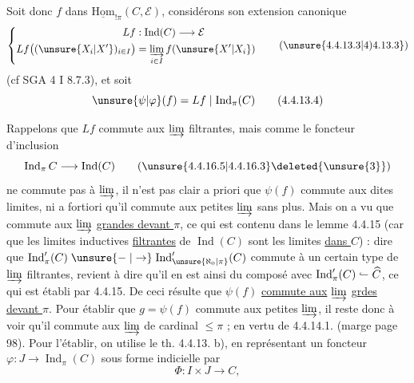 Soit donc $f$ dans $\underline{\mathrm{Hom}}_{!\pi}(C,\mathcal E)$, considérons son extension canonique
\[
\left\{\begin{aligned}
 Lf &: \operatorname{Ind}(C)\longrightarrow\mathcal E\\
 Lf\big((\unsure{X_i|X'})_{i\in I}\big)&=\varinjlim_{i\in I} f(\unsure{X'|X_i})
\end{aligned}\right.\tag*{(\unsure{4.4.13.3|4)4.13.3})}
\]
(cf SGA 4 I 8.7.3), et soit
\[
\unsure{\psi|\varphi}(f)=Lf\mid\operatorname{Ind}_\pi(C)\tag*{(4.4.13.4)}
\]

Rappelons que $Lf$ commute aux  $\varinjlim$ filtrantes, mais comme le foncteur d'inclusion
\[
\operatorname{Ind}_\pi C\longrightarrow\operatorname{Ind}(C)\tag*{(\unsure{4.4.16.5|4.4.16.3}\text{\deleted{\unsure{3}}})}
\]
ne commute pas à  $\varinjlim$,  il n'est pas clair a priori que $\psi(f)$ commute aux dites limites, ni a fortiori qu'il commute aux petites $\varinjlim$ sans plus. Mais on a vu que   commute aux $\varinjlim$ \uline{grandes devant $\pi$}, ce qui est contenu dans le lemme 4.4.15 (car que les limites inductives \uline{filtrantes} de $\operatorname{Ind}(C)$ sont les limites \uline{dans $\widehat C$}) : dire que $\operatorname{Ind}'_\pi(C)\mathrel{\unsure{\relbar|\to}}\operatorname{Ind}'_{\unsure{\aleph_0|\pi}}(C)$ commute à un certain type de $\varinjlim$ filtrantes, revient à dire qu'il en est ainsi du composé avec $\operatorname{Ind}'_\pi(C)\mathrel{\lhook\joinrel\relbar}\widehat C$, ce qui est établi par 4.4.15. De ceci résulte que $\psi(f)$ \uline{commute aux} $\varinjlim$ \uline{grdes devant $\pi$}. Pour établir que $g=\psi(f)$ commute
aux petites $\varinjlim$, il reste donc à voir qu'il commute aux $\varinjlim$ de cardinal $\leq\pi$ ; en vertu de 4.4.14.1. (marge page 98). Pour l'établir, on utilise le th. 4.4.13. b), en représentant un foncteur $\varphi:J\longrightarrow\operatorname{Ind}_\pi(C)$  sous forme indicielle par
\[
\Phi:I\times J\longrightarrow C,\tag*{(4.4.16.6)}
\]
